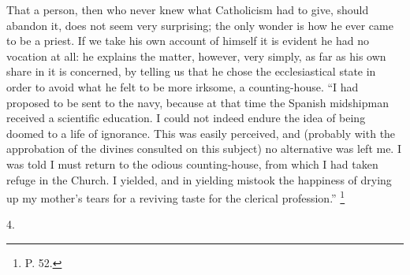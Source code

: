 That a person, then who never knew what Catholicism
had to give, should abandon it, does not seem very
surprising; the only wonder is how he ever came to be a
priest. If we take his own account of himself it is
evident he had no vocation at all: he explains the
matter, however, very simply, as far as his own share in
it is concerned, by telling us that he chose the
ecclesiastical state in order to avoid what he felt to be
more irksome, a counting-house. ``I had proposed to
be sent to the navy, because at that time the Spanish
midshipman received a scientific education. I could not
indeed endure the idea of being doomed to a life of
ignorance. This was easily perceived, and (probably with
the approbation of the divines consulted on this subject)
no alternative was left me. I was told I must return to
the odious counting-house, from which I had taken refuge
in the Church. I yielded, and in yielding mistook the
happiness of drying up my mother's tears for a reviving
taste for the clerical profession.'' \footnote{P. 52.}

4.


